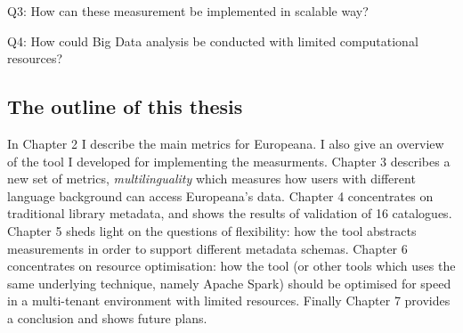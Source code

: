 Q3: How can these measurement be implemented in scalable way?

Q4: How could Big Data analysis be conducted with limited computational resources?

\subsection{The outline of this thesis}

In Chapter 2 I describe the main metrics for Europeana. I also give an overview of the tool I developed for implementing the measurments. Chapter 3 describes a new set of metrics, \emph{multilinguality} which measures how users with different language background can access Europeana's data. Chapter 4 concentrates on traditional library metadata, and shows the results of validation of 16 catalogues. Chapter 5 sheds light on the questions of flexibility: how the tool  abstracts measurements in order to  support different metadata schemas. Chapter 6 concentrates on resource optimisation: how the tool (or other tools which uses the same underlying technique, namely Apache Spark) should be optimised for speed in a multi-tenant environment with limited resources. Finally Chapter 7 provides a conclusion and shows future plans.
